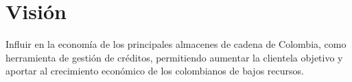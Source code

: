 \section{Visión}

{Influir en la economía de los principales almacenes de cadena de Colombia, como herramienta de gestión de créditos, permitiendo aumentar la clientela objetivo y aportar al crecimiento económico de los colombianos de bajos recursos.}